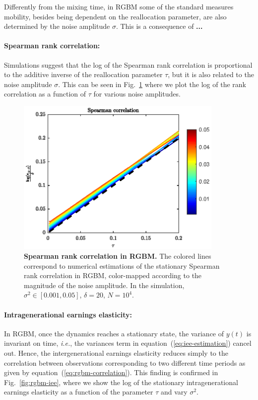 \documentclass[11pt]{article}
\newcommand{\ie}{{\it i.e.}\xspace}
\numberwithin{equation}{section}
\begin{document}
Differently from the mixing time, in RGBM some of the standard measures mobility, besides being dependent on the reallocation parameter, are also determined by the noise amplitude $\sigma$. This is a consequence of \textbf{...}

\paragraph{Spearman rank correlation:} Simulations suggest that the log of the Spearman rank correlation is proportional to the additive inverse of the reallocation parameter $\tau$, but it is also related to the noise amplitude $\sigma$. This can be seen in  Fig.~\ref{fig:rgbm-spearman-correlation} where we plot the log of the rank correlation as a function of $\tau$ for various noise amplitudes.

\begin{figure}[t!]
\includegraphics[width=10cm]{figs/fig_spearman_rgbm.eps}
\caption{\textbf{Spearman rank correlation in RGBM.} The colored lines correspond to numerical estimations of the stationary Spearman rank correlation in RGBM, color-mapped according to the magnitude of the noise amplitude. In the simulation, $\sigma^2 \in \left[ 0.001, 0.05\right]$, $\delta = 20$, $N = 10^4$.\label{fig:rgbm-spearman-correlation}}
\end{figure}

\paragraph{Intragenerational earnings elasticity:} In RGBM, once the dynamics reaches a stationary state, the variance of $y(t)$ is invariant on time, \ie, the variances term in equation~(\ref{eq:iee-estimation}) cancel out. Hence, the  intergenerational earnings elasticity reduces simply to the correlation between observations corresponding to two different time periods as given by equation~(\ref{eq:rgbm-correlation}). This finding is confirmed in Fig.~\ref{fig:rgbm-iee}, where we show the log of the stationary intragenerational earnings elasticity as a function of the parameter $\tau$ and vary $\sigma^2$.
\end{document}
